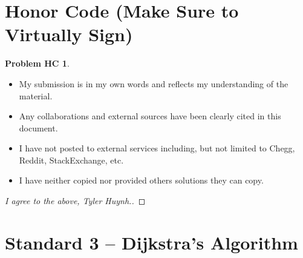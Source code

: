 \documentclass[11pt]{article}
\theoremstyle{definition}
\theoremstyle{definition}
\newtheorem*{requiredHC}{Problem HC}
\theoremstyle{definition}
\begin{document}
\section*{Honor Code (Make Sure to Virtually Sign)} \label{HonorCode}
\hypertarget{HonorCode}{}

\begin{requiredHC}
\begin{itemize}
\item My submission is in my own words and reflects my understanding of the material.
\item Any collaborations and external sources have been clearly cited in this document.
\item I have not posted to external services including, but not limited to Chegg, Reddit, StackExchange, etc.
\item I have neither copied nor provided others solutions they can copy.
\end{itemize}

\end{requiredHC}

\begin{proof}[I agree to the above, Tyler Huynh.]
\end{proof}


\newpage
\setcounter{section}{2}
\section{Standard 3 -- Dijkstra's Algorithm}
\end{document}
